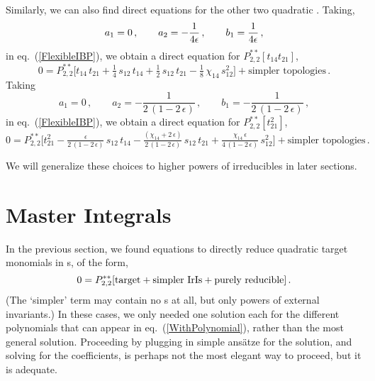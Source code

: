\documentclass[aps,prd,preprint,groupedaddress,nofootinbib,showpacs,eqsecnum]{revtex4}
\def\eqn#1{eq.~(\ref{#1})}
\def\eps{\epsilon}
\def\Pss#1#2{P^{**}_{#1,#2}}
\begin{document}
Similarly, we can also find direct equations for the other
two quadratic .  Taking,
\begin{equation}
a_1 = 
  0
  \,,\qquad
a_2 = 
  -\frac{1}{4\e}
  \,,\qquad
b_1 = 
  \frac{1}{4\e}
  \,,
\end{equation}
in \eqn{FlexibleIBP}, we obtain a direct equation for 
$\Pss22[t_{14} t_{21}]$,
\begin{equation}
0 = \Pss22\bigl[
t_{14}\,t_{21}
+\tfrac{1}{4}\,s_{12}\,t_{14}
+\tfrac{1}{2}\,s_{12}\,t_{21}
-\tfrac{1}{8}\,\chi_{14}\,s_{12}^{2}
\bigr]+\textrm{simpler\ topologies}\,.
\label{QuadraticIBP2}
\end{equation}
Taking
\begin{equation}
a_{1} = 
  0
  \,,\qquad
a_{2} = 
  -\frac{1}{2\,(1-2\,\eps)}
  \,,\qquad
b_{1} = 
  -\frac{1}{2\,(1-2\,\eps)}
  \,,
\end{equation}
in \eqn{FlexibleIBP}, we obtain a direct equation for 
$\Pss22[t_{21}^2]$,
\begin{equation}
0 = \Pss22\bigl[
t_{21}^{2}
-\tfrac{\eps}{2\,(1-2\,\eps)}\,s_{12}\,t_{14}
-\tfrac{(\chi_{14}+2\,\eps)}{2\,(1-2\,\eps)}\,s_{12}\,t_{21}
+\tfrac{\chi_{14}\,\eps}{4\,(1-2\,\eps)}\,s_{12}^{2}
\bigr]+\textrm{simpler\ topologies}\,.
\label{QuadraticIBP3}
\end{equation}

We will generalize these choices to higher powers of irreducibles in
later sections.

\section{Master Integrals}
\label{MasterIntegralsSection}

In the previous section, we found equations to directly reduce
quadratic target monomials in \II{}s, of the form,
\begin{equation}
0 = \Pss22[\textrm{target} + \textrm{simpler\ \II{}s} 
+ \textrm{purely\ reducible}]\,.
\label{GenericIBP}
\end{equation}
(The `simpler' term may contain no \II{}s at all, but
only powers of external invariants.)
In these cases, we only needed one solution each for the
different polynomials that can appear in
\eqn{WithPolynomial}, rather than the most general solution.
Proceeding by plugging in simple ans\"atze for the solution,
and solving for the coefficients, is perhaps not the most
elegant way to proceed, but it is adequate.
\end{document}
